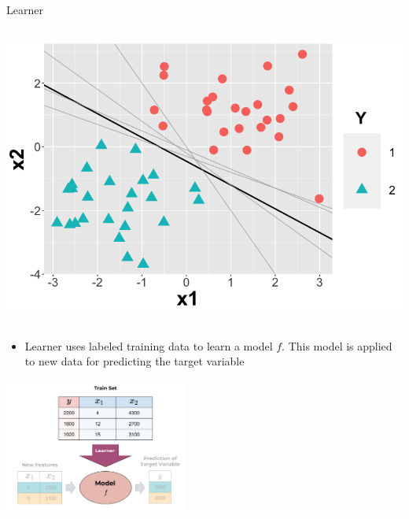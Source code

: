 \documentclass[11pt,compress,t,notes=noshow, xcolor=table]{beamer}
\begin{document}
\begin{vbframe}{Learner}
\begin{columns}
\begin{column}{0.4\textwidth}
  \begin{center}
    \includegraphics[width=\textwidth]{slides/ml-basics/figure/nutshell-ml-basics-hypothesisspace-classif.png} 
  \end{center}
\end{column}    
\end{columns}  

\newpage

\begin{itemize}
\item Learner uses labeled training data to learn a model $f$. This model is applied to new data for predicting the target variable
\end{itemize}

 \begin{center}
    \includegraphics[width = 0.45\textwidth]{figure_man/the_inducer_web.png}
  \end{center}

\end{vbframe}
\end{document}
